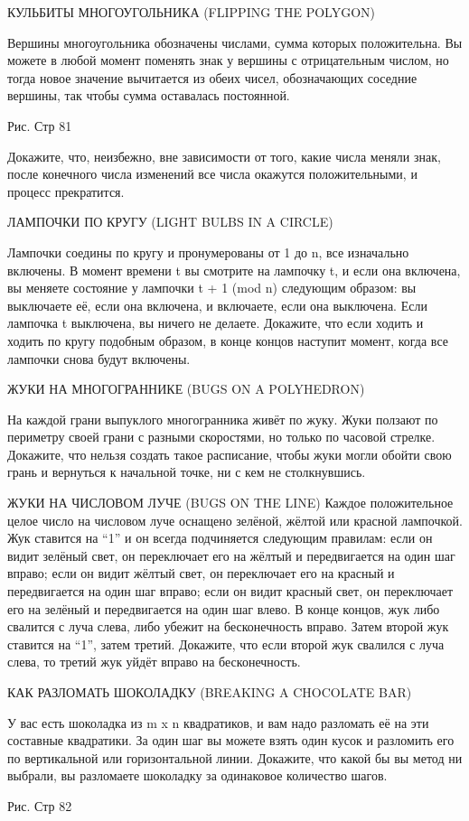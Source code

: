 КУЛЬБИТЫ МНОГОУГОЛЬНИКА (FLIPPING THE POLYGON)


 Вершины многоугольника обозначены числами, сумма которых положительна. Вы можете в любой момент поменять знак у вершины с отрицательным числом, но тогда новое значение вычитается из обеих чисел, обозначающих соседние вершины, так чтобы сумма оставалась постоянной.


                    Рис. Стр 81


 Докажите, что, неизбежно, вне зависимости от того, какие числа меняли знак,  после конечного числа изменений все числа окажутся положительными, и процесс прекратится.




ЛАМПОЧКИ ПО КРУГУ (LIGHT BULBS IN A CIRCLE)


Лампочки соедины по кругу и пронумерованы от 1 до n, все изначально включены.
В момент времени t вы смотрите на лампочку t, и если она включена, вы меняете состояние у лампочки t + 1 (mod n) следующим образом: вы выключаете её, если она включена, и включаете, если она выключена. Если лампочка t выключена, вы ничего не делаете. 
   Докажите, что если ходить и ходить по кругу подобным образом, в конце концов наступит момент, когда все лампочки снова будут включены.


 ЖУКИ НА МНОГОГРАННИКЕ (BUGS ON A POLYHEDRON)


На каждой грани выпуклого многогранника живёт по жуку.  Жуки ползают по периметру своей грани  с разными скоростями, но только по часовой стрелке. Докажите, что нельзя создать такое расписание, чтобы жуки могли обойти свою грань и вернуться к начальной точке, ни с кем не столкнувшись. 


 ЖУКИ НА ЧИСЛОВОМ ЛУЧЕ (BUGS ON THE LINE)
Каждое положительное целое число на числовом луче оснащено зелёной, жёлтой или красной лампочкой. Жук ставится на “1” и он всегда подчиняется следующим правилам: если он видит зелёный свет, он переключает его на жёлтый и передвигается на один шаг вправо; 
если он видит жёлтый свет, он переключает его на красный и  передвигается на один шаг вправо; 
если он видит красный свет, он переключает его на зелёный и  передвигается на один шаг влево.
   В конце концов, жук либо свалится с луча слева, либо убежит на бесконечность вправо. Затем второй жук ставится на “1”, затем третий.
  Докажите, что если второй жук свалился с луча слева, то третий жук уйдёт вправо на бесконечность.


 КАК РАЗЛОМАТЬ ШОКОЛАДКУ (BREAKING A CHOCOLATE BAR)


У вас есть шоколадка из m x n квадратиков, и вам надо разломать её на эти составные квадратики. За один шаг вы можете взять один кусок и разломить его по вертикальной или горизонтальной линии.
  Докажите, что какой бы вы метод ни выбрали, вы разломаете шоколадку за одинаковое количество шагов.




                            Рис. Стр 82